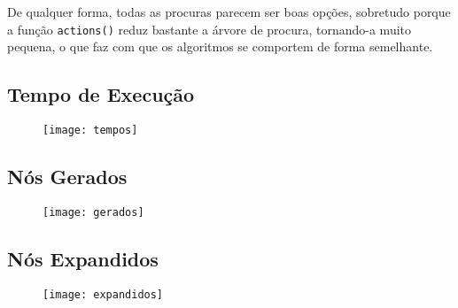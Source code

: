 \documentclass[12pt]{article}
\begin{document}
De qualquer forma, todas as procuras parecem ser boas opções, sobretudo porque
a função \texttt{actions()} reduz bastante a árvore de procura, tornando-a muito
pequena, o que faz com que os algoritmos se comportem de forma semelhante.

\subsection{Tempo de Execução}
\begin{figure}[h!]
\texttt{[image: tempos]}
\centering
\end{figure}

\subsection{Nós Gerados}
\begin{figure}[h!]
\texttt{[image: gerados]}
\centering
\end{figure}

\subsection{Nós Expandidos}
\begin{figure}[h!]
\texttt{[image: expandidos]}
\centering
\end{figure}
\end{document}
